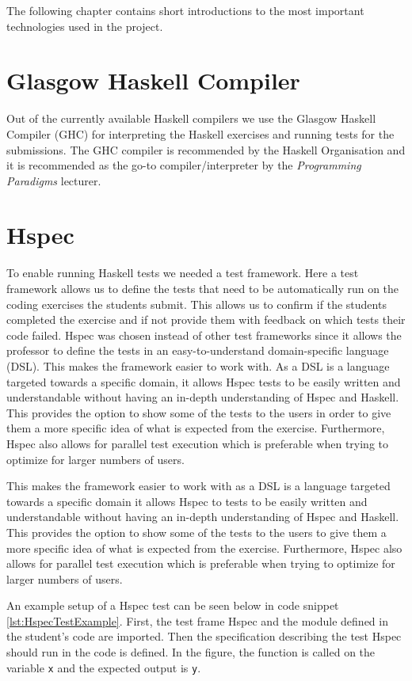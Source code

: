 The following chapter contains short introductions to the most important technologies used in the project.

\section*{Glasgow Haskell Compiler}
Out of the currently available Haskell compilers we use the Glasgow Haskell Compiler (GHC) for interpreting the Haskell exercises and running tests for the submissions. The GHC compiler is recommended by the Haskell Organisation and it is recommended as the go-to compiler/interpreter by the \textit{Programming Paradigms} lecturer\cite{Haskell_GHC}.


\section*{Hspec}
To enable running Haskell tests we needed a test framework. Here a test framework allows us to define the tests that need to be automatically run on the coding exercises the students submit. This allows us to confirm if the students completed the exercise and if not provide them with feedback on which tests their code failed.
Hspec was chosen instead of other test frameworks since it allows the professor to define the tests in an easy-to-understand domain-specific language (DSL).
This makes the framework easier to work with. As a DSL is a language targeted towards a specific domain, it allows Hspec tests to be easily written and understandable without having an in-depth understanding of Hspec and Haskell.
This provides the option to show some of the tests to the users in order to give them a more specific idea of what is expected from the exercise.
Furthermore, Hspec also allows for parallel test execution which is preferable when trying to optimize for larger numbers of users\cite{Hspec_landing}.

This makes the framework easier to work with as a DSL is a language targeted towards a specific domain it allows Hspec to tests to be easily written and understandable without having an in-depth understanding of Hspec and Haskell.
This provides the option to show some of the tests to the users to give them a more specific idea of what is expected from the exercise.
Furthermore, Hspec also allows for parallel test execution which is preferable when trying to optimize for larger numbers of users.

An example setup of a Hspec test can be seen below in code snippet \ref{lst:HspecTestExample}. First, the test frame Hspec and the module defined in the student's code are imported. Then the specification describing the test Hspec should run in the code is defined. In the figure, the function is called on the variable \texttt{x} and the expected output is \texttt{y}.


